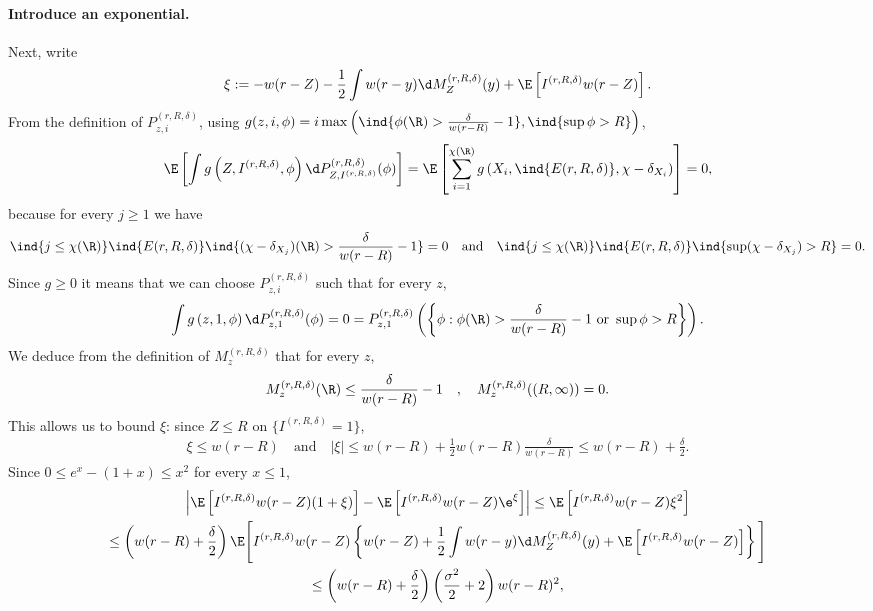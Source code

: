 \documentclass[10pt,a4paper]{article}
\begin{document}
\paragraph{Introduce an exponential.}
Next, write 
\begin{align*}
\xi := - w(r-Z) - \frac{1}{2} \int w(r-y) \d M^{(r,R,\delta)}_{Z} (y) + \E\left[ I^{(r,R,\delta)} w(r-Z) \right] .
\end{align*}
From the definition of $P^{(r,R,\delta)}_{z,i}$, using $g(z,i,\phi) = i \max\left( \ind{\phi(\R)> \frac{\delta}{w(r-R)}-1} , \ind{\sup\phi > R} \right)$, 
\begin{align*}
 \E\left[ \int g\left(Z, I^{(r,R,\delta)}, \phi \right) \d P^{(r,R,\delta)}_{Z, I^{(r,R,\delta)}}(\phi) \right] = \E\left[ \sum_{i=1}^{\chi(\R)} g\left(X_i , \ind{E(r,R,\delta)}, \chi - \delta_{X_i} \right) \right] = 0 ,
\end{align*}
because for every $j\geq 1$ we have 
\[ \ind{j\leq \chi(\R)} \ind{E(r,R,\delta)} \ind{(\chi-\delta_{X_j})(\R) > \frac{\delta}{w(r-R)}-1} = 0 \quad \text{and} \quad  \ind{j\leq \chi(\R)} \ind{E(r,R,\delta)} \ind{\sup(\chi - \delta_{X_j}) > R} = 0 . \] 
Since $g \geq 0$ it means that we can choose $P^{(r,R,\delta)}_{z,i}$ such that for every $z$, 
\[ \int g\left(z, 1, \phi \right) \d P^{(r,R,\delta)}_{z,1}(\phi) = 0 = P_{z,1}^{(r,R,\delta)}\left( \left\{ \phi : \phi(\R) > \frac{\delta}{w(r-R)}-1 \text{ or } \sup\phi > R \right\}\right) . \]
We deduce from the definition of $M^{(r,R,\delta)}_z$ that for every $z$, 
\begin{equation}\label{eq:Palm-controle-M}
M^{(r,R,\delta)}_z(\R) \leq \frac{\delta}{w(r-R)}-1 \quad , \quad M^{(r,R,\delta)}_z((R,\infty)) = 0 .
\end{equation}
This allows us to bound $\xi$: since $Z \leq R$ on $\{ I^{(r,R,\delta)} = 1\}$, 
\begin{align}\label{eq:bound-xi}
\xi \leq w(r-R) \quad \text{and} \quad 
|\xi| \leq w(r-R) + \frac{1}{2} w(r-R) \frac{\delta}{w(r-R)} \leq w(r-R) + \frac{\delta}{2} .
\end{align}
Since $0 \leq e^x - (1+x) \leq x^2$ for every $x\leq 1$, 
\begin{multline*}
\left| \E\left[ I^{(r,R,\delta)} w(r-Z) (1 + \xi) \right] - \E\left[ I^{(r,R,\delta)} w(r-Z) \e^\xi \right] \right| \leq \E\left[ I^{(r,R,\delta)} w(r-Z) \xi^2 \right] \\
\leq \left( w(r-R) + \frac\delta 2\right) \E\Bigg[ I^{(r,R,\delta)} w(r-Z) \left\{ w(r-Z) + \frac{1}{2} \int w(r-y) \d M^{(r,R,\delta)}_{Z} (y) + \E\left[ I^{(r,R,\delta)} w(r-Z) \right] \right\} \Bigg] \\
\leq \left( w(r-R) + \frac\delta 2\right) \left( \frac{\sigma^2}{2} + 2\right) w(r-R)^2 ,
\end{multline*}
\end{document}
